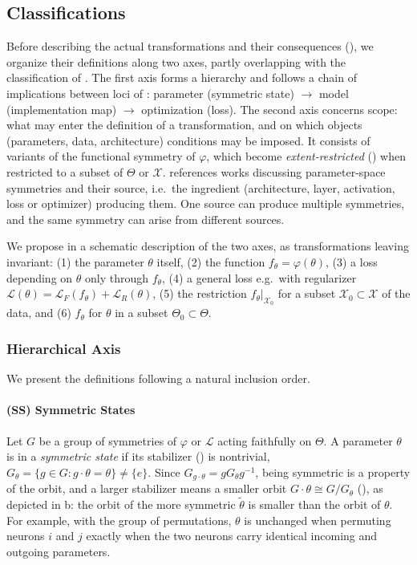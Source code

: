 \documentclass[mathematics,review,submit,moreauthors]{Definitions/mdpi}
\begin{document}
\subsection{Classifications}\label{sec:classifications-param-space-symmetries}
Before describing the actual transformations and their consequences (), we organize their definitions along two axes, partly overlapping with the classification of \citet{zhao2025}.
The first axis forms a hierarchy and follows a chain of implications between loci of : parameter (symmetric state) $\to$ model (implementation map) $\to$ optimization (loss).
The second axis concerns scope: what may enter the definition of a transformation, and on which objects (parameters, data, architecture) conditions may be imposed.
It consists of variants of the functional symmetry of $\varphi$, which become \emph{extent-restricted} () when restricted to a subset of $\Theta$ or $\mathcal X$.
 references works discussing parameter-space symmetries and their source, i.e.\ the ingredient (architecture, layer, activation, loss or optimizer) producing them.
One source can produce multiple symmetries, and the same symmetry can arise from different sources.

We propose in  a schematic description of the two axes, as transformations leaving invariant: (1) the parameter $\theta$ itself, (2) the function $f_\theta=\varphi(\theta)$, (3) a loss depending on $\theta$ only through $f_\theta$, (4) a general loss e.g.\ with regularizer $\mathcal{L}(\theta)=\mathcal{L}_F(f_\theta)+\mathcal{L}_R(\theta)$, (5) the restriction $f_\theta|_{\mathcal{X}_0}$ for a subset $\mathcal{X}_0\subset\mathcal{X}$ of the data, and (6) $f_\theta$ for $\theta$ in a subset $\Theta_0\subset\Theta$.

\subsubsection{Hierarchical Axis}\label{sec:hierarchy-param-space-symmetries}

We present the definitions following a natural inclusion order.

\paragraph{(SS) Symmetric States}
Let $G$ be a group of symmetries of $\varphi$ or $\mathcal{L}$ acting faithfully on $\Theta$.
A parameter $\theta$ is in a \emph{symmetric state} \citep{simsek2021,ziyin2025} if its stabilizer () is nontrivial, $G_\theta=\{g\in G : g\cdot\theta=\theta\}\neq\{e\}$.
Since $G_{g\cdot\theta}=gG_\theta g^{-1}$, being symmetric is a property of the orbit, and a larger stabilizer means a smaller orbit $G\cdot\theta\cong G/G_\theta$ (), as depicted in  b: the orbit of the more symmetric $\tilde \theta$ is smaller than the orbit of $\theta$.
For example, with the group of permutations, $\theta$ is unchanged when permuting neurons $i$ and $j$ exactly when the two neurons carry identical incoming and outgoing parameters.
\end{document}
